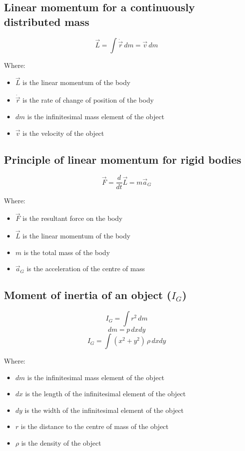 \documentclass[11pt]{article}
\begin{document}
\subsection{Linear momentum for a continuously distributed mass}
\label{sec:org7726f98}
\[\vec{L} = \int \dot{\vec{r}} \, dm = \vec{v} \, dm\]

Where:
\begin{itemize}
\item \(\vec{L}\) is the linear momentum of the body
\item \(\dot{\vec{r}}\) is the rate of change of position of the body
\item \(dm\) is the infinitesimal mass element of the object
\item \(\vec{v}\) is the velocity of the object
\end{itemize}
\subsection{Principle of linear momentum for rigid bodies}
\label{sec:orgbe226b1}
\[\vec{F} = \frac{d}{dt} \vec{L} = m \vec{a}_G\]

Where:
\begin{itemize}
\item \(\vec{F}\) is the resultant force on the body
\item \(\vec{L}\) is the linear momentum of the body
\item \(m\) is the total mass of the body
\item \(\vec{a}_G\) is the acceleration of the centre of mass
\end{itemize}
\subsection{Moment of inertia of an object (\(I_G\))}
\label{sec:org5d20ca0}
\[I_G = \int r^2 \, dm\]
\[dm = p \, dx dy\]
\[I_G = \int (x^2 + y^2) \, \rho \, dx dy\]

Where:
\begin{itemize}
\item \(dm\) is the infinitesimal mass element of the object
\item \(dx\) is the length of the infinitesimal element of the object
\item \(dy\) is the width of the infinitesimal element of the object
\item \(r\) is the distance to the centre of mass of the object
\item \(\rho\) is the density of the object
\end{itemize}
\end{document}
